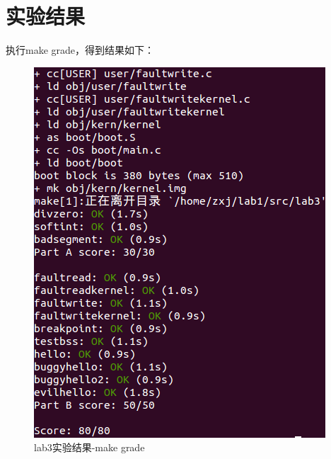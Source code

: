 \documentclass[12pt,a4paper,UTF8]{article}
\begin{document}
\section{实验结果}
执行make grade，得到结果如下：
    \begin{figure}[H]
        \centering
        \includegraphics[width = .85\linewidth]{img/3.png}
        \caption{lab3实验结果-make grade}
        \label{fig::figure1}
    \end{figure}
\end{document}
